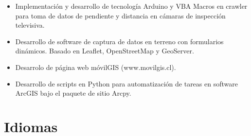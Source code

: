 \documentclass[11pt,a4paper,sans]{moderncv}        %
\begin{document}
\begin{itemize}
\item Implementación y desarrollo de tecnología Arduino y VBA Macros en crawler para toma de datos de pendiente y distancia en cámaras de inspección televisiva.
\item Desarrollo de software de captura de datos en terreno con formularios dinámicos. Basado en Leaflet, OpenStreetMap y GeoServer.
\item Desarrolo de página web móvilGIS (www.movilgis.cl).
\item Desarrollo de scripts en Python para automatización de tareas en software ArcGIS bajo el paquete de sitio Arcpy.
\end{itemize}

\section{Idiomas}



\end{document}
